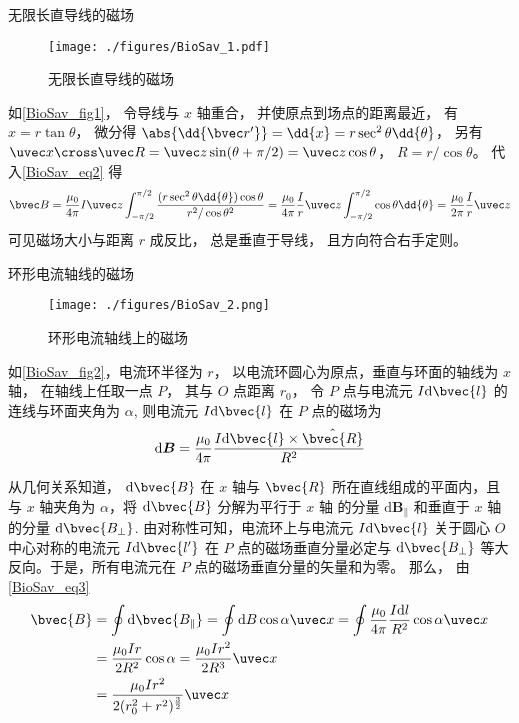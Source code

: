 \begin{example}{无限长直导线的磁场}\label{BioSav_ex1}
\begin{figure}[ht]
\centering
\texttt{[image: ./figures/BioSav\_1.pdf]}
\caption{无限长直导线的磁场} \label{BioSav_fig1}
\end{figure}
如\autoref{BioSav_fig1}， 令导线与 $x$ 轴重合， 并使原点到场点的距离最近， 有 $x = r\tan\theta$， 微分得 $\abs{\dd{\bvec r'}} = \dd{x} = r\sec^2\theta\dd{\theta}$， 另有 $\uvec x\cross\uvec R = \uvec z\sin(\theta + \pi/2) = \uvec z\cos\theta $， $R = r/\cos\theta$。 代入\autoref{BioSav_eq2} 得
\begin{equation}
\bvec B = \frac{\mu_0}{4\pi} I \uvec z\int_{-\pi/2}^{\pi/2} \frac{(r \sec^2\theta \dd{\theta}) \cos\theta}{r^2/\cos\theta^2}
= \frac{\mu_0}{4\pi} \frac Ir \uvec z\int_{-\pi/2}^{\pi/2} \cos\theta \dd{\theta}
= \frac{\mu_0}{2\pi} \frac Ir\uvec z
\end{equation}
可见磁场大小与距离 $r$ 成反比， 总是垂直于导线， 且方向符合右手定则。
\end{example}

\begin{example}{环形电流轴线的磁场}\label{BioSav_ex2}
\begin{figure}[ht]
\centering
\texttt{[image: ./figures/BioSav\_2.png]}
\caption{环形电流轴线上的磁场} \label{BioSav_fig2}
\end{figure}
如\autoref{BioSav_fig2}，电流环半径为 $r$， 以电流环圆心为原点，垂直与环面的轴线为 $x$ 轴， 在轴线上任取一点 $P$， 其与 $O$ 点距离 $r_0$， 令 $P$ 点与电流元 $I\mathrm{d}\bvec{l}$ 的连线与环面夹角为 $\alpha$, 则电流元 $I\mathrm{d}\bvec{l}$ 在 $P$ 点的磁场为
\begin{equation}
\mathrm{d}\boldsymbol{B}=\frac{\mu_0}{4\pi}\frac{I\mathrm{d}\bvec{l}\times\hat{\bvec{R}}}{R^2}
\end{equation}

从几何关系知道， $\mathrm{d}\bvec{B}$ 在 $x$ 轴与 $\bvec{R}$ 所在直线组成的平面内，且与 $x$ 轴夹角为 $\alpha$，将 $\mathrm{d}\bvec{B}$ 分解为平行于 $x$ 轴 的分量 $\mathrm{d}\boldsymbol{B_\parallel}$ 和垂直于 $x$ 轴的分量 $\mathrm{d}\bvec{B_\bot}$. 由对称性可知，电流环上与电流元 $I\mathrm{d}\bvec{l}$ 关于圆心 $O$ 中心对称的电流元 $I\mathrm{d}\bvec{l'}$ 在 $P$ 点的磁场垂直分量必定与 $\mathrm{d}\bvec{B_\bot}$ 等大反向。于是，所有电流元在 $P$ 点的磁场垂直分量的矢量和为零。 那么， 由\autoref{BioSav_eq3} 
\begin{equation}
\begin{aligned}
\bvec{B}&=\oint{\mathrm{d}\bvec{B_\parallel}}=\oint\mathrm{d}B\cos{\alpha}\uvec x=\oint\frac{\mu_0}{4\pi}\frac{I\mathrm{d}l}{R^2}\cos\alpha\uvec x\\
&=\frac{\mu_0Ir}{2R^2}\cos\alpha=\frac{\mu_0Ir^2}{2R^3}\uvec x\\
&=\frac{\mu_0Ir^2}{2(r_0^2+r^2)^{\frac{3}{2}}}\uvec x
\end{aligned}
\end{equation}
\end{example}


